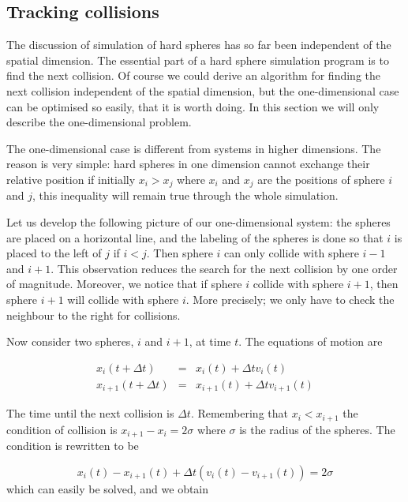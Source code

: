 \subsection{Tracking collisions}
\label{sect:Track1d}
The discussion of simulation of hard spheres has so far been
independent of the spatial dimension. The essential part of a hard
sphere simulation program is to find the next collision. Of course we
could derive an algorithm for finding the next collision independent of
the spatial dimension, but the one-dimensional case can be optimised
so easily, that it is worth doing. In this section we will only describe
the one-dimensional problem.

The one-dimensional case is different from systems in higher
dimensions. The reason is very simple: hard spheres in one dimension
cannot exchange their relative position \ie if initially $x_i > x_j$
where $x_i$ and $x_j$ are the positions of sphere $i$ and $j$, this
inequality will remain true through the whole simulation.

Let us develop the following picture of our one-dimensional system:
the spheres are placed on a horizontal line, and the labeling of the
spheres is done so that $i$ is placed to the left of $j$ if $i<j$. Then
sphere $i$ can only collide with sphere $i-1$ and $i+1$. This
observation reduces the search for the next collision by one
order of magnitude. Moreover, we notice that if sphere $i$ collide
with sphere $i+1$, then sphere $i+1$ will collide with sphere
$i$. More precisely; we only have to check the neighbour to the right
for collisions.

Now consider two spheres, $i$ and $i+1$, at time $t$. The equations of
motion are

\begin{subequations}
  \begin{eqnarray}
    x_i(t+\Delta t)     &=& x_i(t) + \Delta t v_i(t) \\
    x_{i+1}(t+\Delta t) &=& x_{i+1}(t) + \Delta t v_{i+1}(t)
  \end{eqnarray}
\end{subequations}

The time until the next collision is $\Delta t$. Remembering that
$x_i<x_{i+1}$ the condition of collision is $x_{i+1}-x_i=2\sigma$
where $\sigma$ is the radius of the spheres. The condition is rewritten
to be

\begin{equation}
  x_i(t)-x_{i+1}(t)+\Delta t(v_i(t)-v_{i+1}(t)) = 2\sigma
\end{equation}
which can easily be solved, and we obtain

